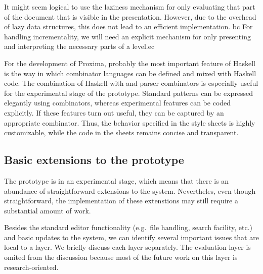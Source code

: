 \bc
It might seem logical to use the laziness mechanism for only evaluating that part of the document that is visible in the presentation. However, due to the overhead of lazy data structures, this does not lead to an efficient implementation. bc For handling incrementality, we will need an explicit mechanism for only presenting and interpreting the necessary parts of a level.ec 
\ec

For the development of Proxima, probably the most important feature of Haskell is the way in which combinator languages can be defined and mixed with Haskell code. The combination of Haskell with {\Xprez}  and parser combinators is especially useful for the experimental stage of the prototype. Standard patterns can be expressed elegantly using combinators, whereas experimental features can be coded explicitly. If these features turn out useful, they can be captured by an appropriate combinator. Thus, the behavior specified in the style sheets is highly customizable, while the code in the sheets remains concise and transparent.


\subsection{Basic extensions to the prototype}

The prototype is in an experimental stage, which means that there is an abundance of straightforward extensions to the system. Nevertheles, even though  straightforward, the implementation of these extenstions may still require a substantial amount of work. 

Besides the standard editor functionality (e.g.\  file handling, search facility, etc.) and basic updates to the system, we can identify several important issues that are local to a layer. We briefly discuss each layer separately. The evaluation layer is omited from the discussion because most of the future work on this layer is research-oriented.

%
%


